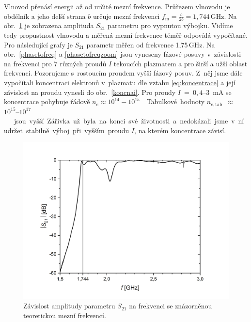 \documentclass[a4paper,12pt]{article}
\begin{document}
Vlnovod přenásí energii až od určité mezní frekvence. Průřezem vlnovodu je 
obdélník a jeho delší strana $b$ určuje mezní frekvenci $f_{\text{m}} = 
\frac{c}{2b} = 1,744\,\si{\giga\hertz}$. Na obr.~\ref{S21vyp} je zobrazena 
amplituda $S_{21}$ parametru pro vypnutou výbojku. Vidíme tedy propustnost 
vlnovodu a měřená mezní frekvence téměř odpovídá vypočítané. Pro následující 
grafy je $S_{21}$ parametr měřen od frekvence 1,75\,\si{\giga\hertz}. Na 
obr.~\ref{phasetofreq} a \ref{phasetofreqzoom} jsou vyneseny fázové posuvy
v~závislosti na frekvenci pro 7 různých proudů $I$ tekoucích plazmatem a pro 
širší a užší oblast frekvencí. Pozorujeme s~rostoucím proudem vyšší fázový 
posuv. Z~něj jsme dále vypočítali koncentraci elektronů v~plazmatu dle vztahu 
\eqref{eq:koncentrace} a její závislost na proudu vynesli do 
obr.~\ref{koncnai}. Pro proudy $I$~=~$0,4$--$3$~\si{\milli\ampere} se 
koncentrace 
pohybuje řádově $n_e \approx 10^{14}-10^{15}$~\si{\cubic\per\meter}. Tabulkové 
hodnoty 
$n_{e,\text{tab}}$~$\approx$~$10^{15}$--$10^{17}$~\si{\cubic\per\meter}
\cite{conc} jsou vyšší. Zářivka už byla na konci své životnosti a nedokázali 
jsme v~ní udržet stabilně výboj při vyšším proudu $I$, na kterém koncentrace 
závisí. 


\begin{figure}[h]
	\centering
	\includegraphics[width=0.9\linewidth]{S21vyp.png}
	\caption{Závislost amplitudy parametru $S_{21}$ na frekvenci se znázorněnou 
	teoretickou mezní frekvencí.}
	\label{S21vyp}
\end{figure}
\end{document}
